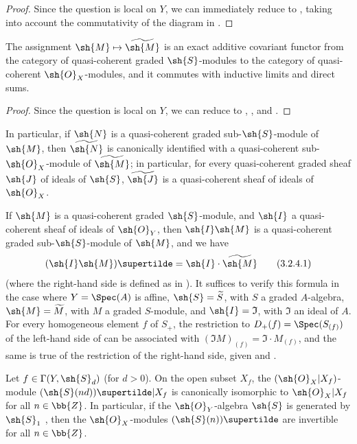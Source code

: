 \begin{proof}
Since the question is local on $Y$, we can immediately reduce to , taking into account the commutativity of the diagram in .
\end{proof}

\begin{proposition}[3.2.4]
\label{II.3.2.4}
The assignment $\sh{M}\mapsto\widetilde{\sh{M}}$ is an exact additive covariant functor from the category of quasi-coherent graded $\sh{S}$-modules to the category of quasi-coherent $\sh{O}_X$-modules, and it commutes with inductive limits and direct sums.
\end{proposition}

\begin{proof}
Since the question is local on $Y$, we can reduce to , , and .
\end{proof}

In particular, if $\sh{N}$ is a quasi-coherent graded sub-$\sh{S}$-module of $\sh{M}$, then $\widetilde{\sh{N}}$ is canonically identified with a quasi-coherent sub-$\sh{O}_X$-module of $\widetilde{\sh{M}}$;
in particular, for every quasi-coherent graded sheaf $\sh{J}$ of ideals of $\sh{S}$, $\widetilde{\sh{J}}$ is a quasi-coherent sheaf of ideals of $\sh{O}_X$.

If $\sh{M}$ is a quasi-coherent graded $\sh{S}$-module, and $\sh{I}$ a quasi-coherent sheaf of ideals of $\sh{O}_Y$, then $\sh{I}\sh{M}$ is a quasi-coherent graded sub-$\sh{S}$-module of $\sh{M}$, and we have
\[
\label{II.3.2.4.1}
  (\sh{I}\sh{M})\supertilde = \sh{I}\cdot\widetilde{\sh{M}}
\tag{3.2.4.1}
\]
(where the right-hand side is defined as in ).
It suffices to verify this formula in the case where $Y=\Spec(A)$ is affine, $\sh{S}=\widetilde{S}$, with $S$ a graded $A$-algebra, $\sh{M}=\widetilde{M}$, with $M$ a graded $S$-module, and $\sh{I}=\mathfrak{I}$, with $\mathfrak{I}$ an ideal of $A$.
For every homogeneous element $f$ of $S_+$, the restriction to $D_+(f)=\Spec(S_{(f)})$ of the left-hand side of  can be associated with $(\mathfrak{I}M)_{(f)}=\mathfrak{I}\cdot M_{(f)}$, and the same is true of the restriction of the right-hand side, given  and .

\begin{proposition}[3.2.5]
\label{II.3.2.5}
Let $f\in\Gamma(Y,\sh{S}_d)$ (for $d>0$).
On the open subset $X_f$, the $(\sh{O}_X|X_f)$-module $(\sh{S}(nd))\supertilde|X_f$ is canonically isomorphic to $\sh{O}_X|X_f$ for all $n\in\bb{Z}$.
In particular, if the $\sh{O}_Y$-algebra $\sh{S}$ is generated by $\sh{S}_1$ , then the $\sh{O}_X$-modules $(\sh{S}(n))\supertilde$ are invertible for all $n\in\bb{Z}$.
\end{proposition}

